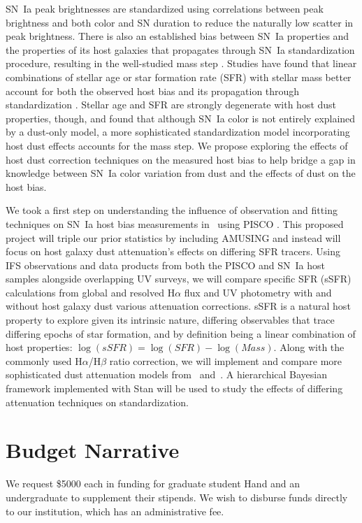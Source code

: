 \documentclass[modern]{aastex63}
\begin{document}
SN~Ia peak brightnesses are standardized using correlations between peak brightness and both color and SN duration to reduce the naturally low scatter in peak brightness.
There is also an established bias between SN~Ia properties and the properties of its host galaxies that propagates through SN~Ia standardization procedure, resulting in the well-studied mass step \citep{Sullivan2010}. 
Studies have found that linear combinations of stellar age or star formation rate (SFR) with stellar mass better account for both the observed host bias and its propagation through standardization \citep{Rigault2018,Rose2021}.
Stellar age and SFR are strongly degenerate with host dust properties, though, and \cite{Brout2021} found that although SN~Ia color is not entirely explained by a dust-only model, a more sophisticated standardization model incorporating host dust effects accounts for the mass step.
We propose exploring the effects of host dust correction techniques on the measured host bias to help bridge a gap in knowledge between SN~Ia color variation from dust and the effects of dust on the host bias.

We took a first step on understanding the influence of observation and fitting techniques on SN~Ia host bias measurements in~\cite{Hand2021} using PISCO \citep{Galbany2018}.  
This proposed project will triple our prior statistics by including AMUSING \citep{Galbany2016a} and instead will focus on host galaxy dust attenuation's effects on differing SFR tracers. 
Using IFS observations and data products from both the PISCO and  SN~Ia host samples alongside overlapping UV surveys, we will compare specific SFR (sSFR) calculations from global and resolved H$\alpha$ flux and UV photometry with and without host galaxy dust various attenuation corrections.
sSFR is a natural host property to explore given its intrinsic nature, differing observables that trace differing epochs of star formation, and by definition being a linear combination of host properties: $\log(sSFR) = \log(SFR) - \log(Mass)$.
Along with the commonly used H$\alpha$/H$\beta$ ratio correction, we will implement and compare more sophisticated dust attenuation models from~\cite{Salim2018} and~\cite{Narayanan2018}.  
A hierarchical Bayesian framework implemented with Stan will be used to study the effects of differing attenuation techniques on standardization.

\section{Budget Narrative}
We request \$5000 each in funding for graduate student Hand and an undergraduate to supplement their stipends.  We wish to disburse funds directly to our institution, which has an administrative fee.



\end{document}
